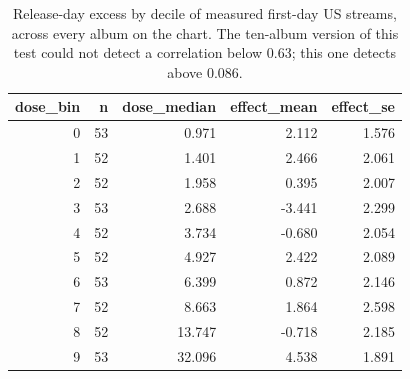 \begin{table}
\caption{Release-day excess by decile of measured first-day US streams, across every album on the chart. The ten-album version of this test could not detect a correlation below 0.63; this one detects above 0.086.}
\begin{tabular}{rrrrr}
\toprule
dose\_bin & n & dose\_median & effect\_mean & effect\_se \\
\midrule
0 & 53 & 0.971 & 2.112 & 1.576 \\
1 & 52 & 1.401 & 2.466 & 2.061 \\
2 & 52 & 1.958 & 0.395 & 2.007 \\
3 & 53 & 2.688 & -3.441 & 2.299 \\
4 & 52 & 3.734 & -0.680 & 2.054 \\
5 & 52 & 4.927 & 2.422 & 2.089 \\
6 & 53 & 6.399 & 0.872 & 2.146 \\
7 & 52 & 8.663 & 1.864 & 2.598 \\
8 & 52 & 13.747 & -0.718 & 2.185 \\
9 & 53 & 32.096 & 4.538 & 1.891 \\
\bottomrule
\end{tabular}
\end{table}
